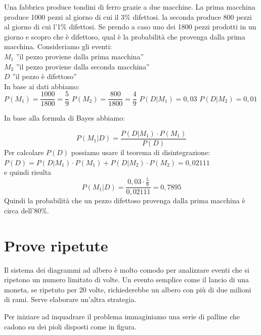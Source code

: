 \begin{esempio}
Una fabbrica produce tondini di ferro grazie a due macchine. La prima 
macchina 
produce 1000 pezzi al giorno di cui il 3\% difettosi. la seconda produce 800 
pezzi al giorno di cui l'1\% difettosi. Se prendo a caso uno dei 1800 pezzi 
prodotti in un giorno e scopro che è difettoso, qual è la probabilità che 
provenga dalla prima macchina.
Consideriamo gli eventi:\\
$M_1$ ''il pezzo proviene dalla prima macchina''\\
$M_2$ ''il pezzo proviene dalla seconda macchina''\\
$D$ ''il pezzo è difettoso''\\
In base ai dati abbiamo:\\
$P(M_1)=\dfrac{1000}{1800}=\dfrac{5}{9}$
$P(M_2)=\dfrac{800}{1800}=\dfrac{4}{9}$
$P(D|M_1)=0,03$
$P(D|M_2)=0,01$
\end{esempio}

In base alla formula di Bayes abbiamo:

$$P(M_1|D)=\dfrac{P(D|M_1)\cdot P(M_1)}{P(D)}$$
Per calcolare $P(D)$ possiamo usare il teorema di disintegrazione:\\
$P(D)=P(D|M_1)\cdot P(M_1) + P(D|M_2)\cdot P(M_2)=0,02111$\\
e quindi risulta 
$$P(M_1|D)=\dfrac{0,03 \cdot \frac{5}{9}}{0,02111}=0,7895$$
Quindi la probabilità che un pezzo difettoso provenga dalla prima macchina è 
circa dell'80\%.

\section{Prove ripetute}

Il sistema dei diagrammi ad albero è molto comodo per analizzare eventi che 
si ripetono un numero limitato di volte. Un evento semplice come il lancio di 
una moneta, se ripetuto per 20 volte, richiederebbe un albero con più di due 
milioni di rami. Serve elaborare un'altra strategia. 

Per iniziare ad inquadrare il problema immaginiamo una serie di palline che 
cadono su dei pioli disposti come in figura. 


